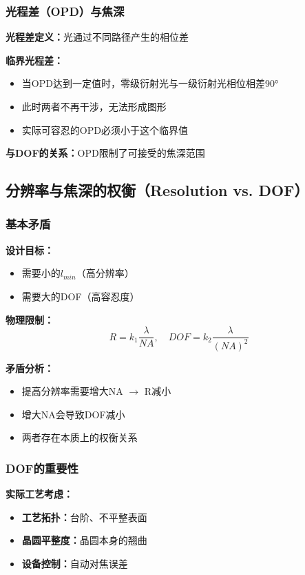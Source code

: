 \documentclass[UTF8,12pt,a4paper]{ctexart}
\begin{document}
\subsubsection{光程差（OPD）与焦深}

\textbf{光程差定义：}光通过不同路径产生的相位差

\textbf{临界光程差：}
\begin{itemize}
    \item 当OPD达到一定值时，零级衍射光与一级衍射光相位相差90°
    \item 此时两者不再干涉，无法形成图形
    \item 实际可容忍的OPD必须小于这个临界值
\end{itemize}

\textbf{与DOF的关系：}OPD限制了可接受的焦深范围

\subsection{分辨率与焦深的权衡（Resolution vs. DOF）}

\subsubsection{基本矛盾}

\textbf{设计目标：}
\begin{itemize}
    \item 需要小的$l_{min}$（高分辨率）
    \item 需要大的DOF（高容忍度）
\end{itemize}

\textbf{物理限制：}
\begin{equation}
R = k_1\frac{\lambda}{NA}, \quad DOF = k_2\frac{\lambda}{(NA)^2}
\end{equation}

\textbf{矛盾分析：}
\begin{itemize}
    \item 提高分辨率需要增大NA $\rightarrow$ R减小
    \item 增大NA会导致DOF减小
    \item 两者存在本质上的权衡关系
\end{itemize}

\subsubsection{DOF的重要性}

\textbf{实际工艺考虑：}
\begin{itemize}
    \item \textbf{工艺拓扑：}台阶、不平整表面
    \item \textbf{晶圆平整度：}晶圆本身的翘曲
    \item \textbf{设备控制：}自动对焦误差
\end{itemize}
\end{document}
